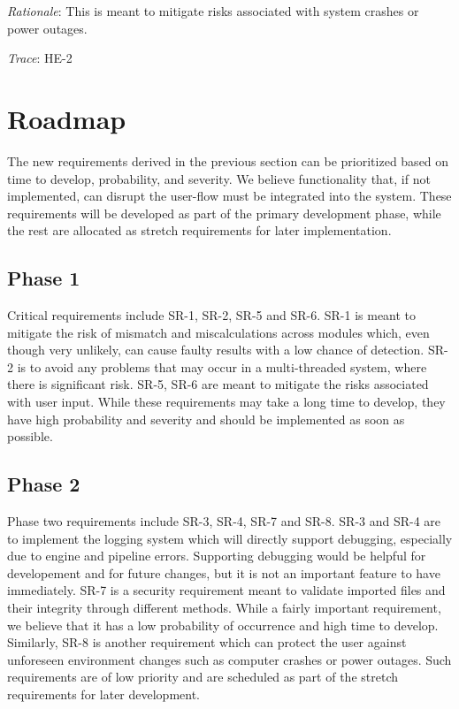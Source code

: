 \documentclass{article}
\begin{document}
\emph{Rationale}: This is meant to mitigate risks associated with system crashes or power outages.

\emph{Trace}: HE-2\\

\section{Roadmap}

The new requirements derived in the previous section can be prioritized based on time to develop, probability, and 
severity. We believe functionality that, if not implemented, can disrupt the user-flow must be integrated into the 
system. These requirements will be developed as part of the primary development phase, while the rest are allocated as 
stretch requirements for later implementation. 

\subsection{Phase 1}
Critical requirements include SR-1, SR-2, SR-5 and SR-6. SR-1 is meant to mitigate the risk of mismatch and 
miscalculations across modules which, even though very unlikely, can cause faulty results with a low chance of 
detection. SR-2 is to avoid any problems that may occur in a multi-threaded system, where there is significant risk.
SR-5, SR-6 are meant to mitigate the risks associated with user input. While these requirements may 
take a long time to develop, they have high probability and severity and should be implemented as soon as possible.

\subsection{Phase 2}
Phase two requirements include SR-3, SR-4, SR-7 and SR-8. SR-3 and SR-4 are to implement the logging system which will
directly support debugging, especially due to engine and pipeline errors. Supporting debugging would be helpful for developement
and for future changes, but it is not an important feature to have immediately. SR-7 is a security requirement meant to
validate imported files and their integrity through different methods. While a fairly important requirement, we believe
that it has a low probability of occurrence and high time to develop. Similarly, SR-8 is another requirement which can
protect the user against unforeseen environment changes such as computer crashes or power outages. Such requirements are
of low priority and are scheduled as part of the stretch requirements for later development.
\end{document}
